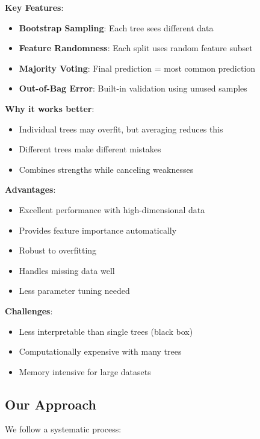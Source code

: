 \textbf{Key Features}:
\begin{itemize}
    \item \textbf{Bootstrap Sampling}: Each tree sees different data
    \item \textbf{Feature Randomness}: Each split uses random feature subset
    \item \textbf{Majority Voting}: Final prediction = most common prediction
    \item \textbf{Out-of-Bag Error}: Built-in validation using unused samples
\end{itemize}

\textbf{Why it works better}:
\begin{itemize}
    \item Individual trees may overfit, but averaging reduces this
    \item Different trees make different mistakes
    \item Combines strengths while canceling weaknesses
\end{itemize}

\textbf{Advantages}:
\begin{itemize}
    \item Excellent performance with high-dimensional data
    \item Provides feature importance automatically
    \item Robust to overfitting
    \item Handles missing data well
    \item Less parameter tuning needed
\end{itemize}

\textbf{Challenges}:
\begin{itemize}
    \item Less interpretable than single trees (black box)
    \item Computationally expensive with many trees
    \item Memory intensive for large datasets
\end{itemize}

\subsection{Our Approach}
We follow a systematic process:

